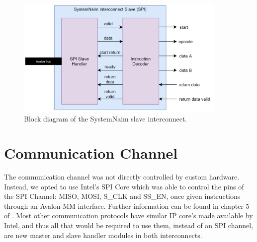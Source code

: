 \begin{figure}[!h]
    \centering
    \includegraphics[width=0.9\textwidth]{04_Implementation/images/interconnect_slave.png}
    \caption{Block diagram of the SystemNaim slave interconnect.}
    \label{fig:slave_interconnect}
\end{figure}

\section{Communication Channel}

The communication channel was not directly controlled by custom hardware. Instead, we opted to use Intel's SPI Core which was able to control the pins of the SPI Channel: MISO, MOSI, S\_CLK and SS\_EN, once given instructions through an Avalon-MM interface. Further information can be found in chapter 5 of \cite{intel-embedded-periph}. Most other communication protocols have similar IP core's made available by Intel, and thus all that would be required to use them, instead of an SPI channel, are new master and slave handler modules in both interconnects.